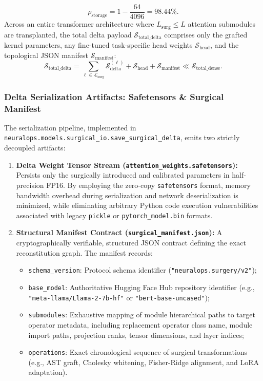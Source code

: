 \begin{equation}
    \rho_{\text{storage}} = 1 - \frac{64}{4096} = 98.44\%.
\end{equation}
Across an entire transformer architecture where $L_{\text{surg}} \le L$ attention submodules are transplanted, the total delta payload $\mathcal{S}_{\text{total\_delta}}$ comprises only the grafted kernel parameters, any fine-tuned task-specific head weights $\mathcal{S}_{\text{head}}$, and the topological JSON manifest $\mathcal{S}_{\text{manifest}}$:
\begin{equation}
    \mathcal{S}_{\text{total\_delta}} = \sum_{\ell \in \mathcal{L}_{\text{surg}}} \mathcal{S}_{\text{delta}}^{(\ell)} + \mathcal{S}_{\text{head}} + \mathcal{S}_{\text{manifest}} \ll \mathcal{S}_{\text{total\_dense}}.
    \label{eq:total_delta_sum}
\end{equation}

\subsubsection{Delta Serialization Artifacts: Safetensors \& Surgical Manifest}
The serialization pipeline, implemented in \texttt{neuralops.models.surgical\_io.save\_surgical\_delta}, emits two strictly decoupled artifacts:
\begin{enumerate}
    \item \textbf{Delta Weight Tensor Stream (\texttt{attention\_weights.safetensors}):}
    Persists only the surgically introduced and calibrated parameters in half-precision FP16. By employing the zero-copy \texttt{safetensors} format, memory bandwidth overhead during serialization and network deserialization is minimized, while eliminating arbitrary Python code execution vulnerabilities associated with legacy \texttt{pickle} or \texttt{pytorch\_model.bin} formats.
    \item \textbf{Structural Manifest Contract (\texttt{surgical\_manifest.json}):}
    A cryptographically verifiable, structured JSON contract defining the exact reconstitution graph. The manifest records:
    \begin{itemize}
        \item \texttt{schema\_version}: Protocol schema identifier (\texttt{"neuralops.surgery/v2"});
        \item \texttt{base\_model}: Authoritative Hugging Face Hub repository identifier (e.g., \texttt{"meta-llama/Llama-2-7b-hf"} or \texttt{"bert-base-uncased"});
        \item \texttt{submodules}: Exhaustive mapping of module hierarchical paths to target operator metadata, including replacement operator class name, module import paths, projection ranks, tensor dimensions, and layer indices;
        \item \texttt{operations}: Exact chronological sequence of surgical transformations (e.g., AST graft, Cholesky whitening, Fisher-Ridge alignment, and LoRA adaptation).
    \end{itemize}
\end{enumerate}

